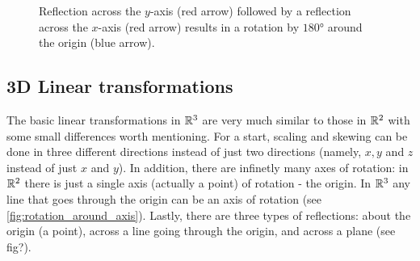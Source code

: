 \begin{figure}
	\centering
	\caption{Reflection across the $y$-axis (red arrow) followed by a reflection across the $x$-axis (red arrow) results in a rotation by $\ang{180}$ around the origin (blue arrow).}
	\label{fig:two_reflections_rotation}
\end{figure}

\subsection{3D Linear transformations}
The basic linear transformations in $\mathbb{R}^{3}$ are very much similar to those in $\mathbb{R}^{2}$ with some small differences worth mentioning. For a start, scaling and skewing can be done in three different directions instead of just two directions (namely, $x,y$ and $z$ instead of just $x$ and $y$). In addition, there are infinetly many axes of rotation: in $\mathbb{R}^{2}$ there is just a single axis (actually a point) of rotation - the origin. In $\mathbb{R}^{3}$ any line that goes through the origin can be an axis of rotation (see \autoref{fig:rotation_around_axis}). Lastly, there are three types of reflections: about the origin (a point), across a line going through the origin, and across a plane (see fig?).

